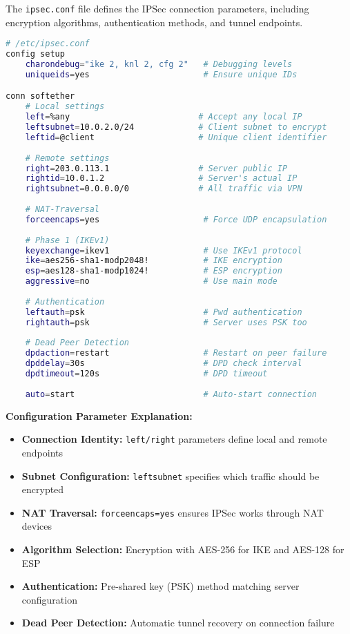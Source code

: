 The \texttt{ipsec.conf} file defines the IPSec connection parameters, including encryption algorithms, authentication methods, and tunnel endpoints.

\begin{lstlisting}[language=bash]
# /etc/ipsec.conf
config setup
    charondebug="ike 2, knl 2, cfg 2"   # Debugging levels
    uniqueids=yes                       # Ensure unique IDs

conn softether
    # Local settings
    left=%any                          # Accept any local IP
    leftsubnet=10.0.2.0/24             # Client subnet to encrypt
    leftid=@client                     # Unique client identifier
    
    # Remote settings  
    right=203.0.113.1                  # Server public IP
    rightid=10.0.1.2                   # Server's actual IP
    rightsubnet=0.0.0.0/0              # All traffic via VPN
    
    # NAT-Traversal
    forceencaps=yes                     # Force UDP encapsulation
    
    # Phase 1 (IKEv1)
    keyexchange=ikev1                   # Use IKEv1 protocol
    ike=aes256-sha1-modp2048!           # IKE encryption
    esp=aes128-sha1-modp1024!           # ESP encryption
    aggressive=no                       # Use main mode
    
    # Authentication
    leftauth=psk                        # Pwd authentication
    rightauth=psk                       # Server uses PSK too
    
    # Dead Peer Detection
    dpdaction=restart                   # Restart on peer failure
    dpddelay=30s                        # DPD check interval
    dpdtimeout=120s                     # DPD timeout
    
    auto=start                          # Auto-start connection
\end{lstlisting}

\textbf{Configuration Parameter Explanation:}

\begin{itemize}
    \item \textbf{Connection Identity:} \texttt{left/right} parameters define local and remote endpoints
    \item \textbf{Subnet Configuration:} \texttt{leftsubnet} specifies which traffic should be encrypted
    \item \textbf{NAT Traversal:} \texttt{forceencaps=yes} ensures IPSec works through NAT devices
    \item \textbf{Algorithm Selection:} Encryption with AES-256 for IKE and AES-128 for ESP
    \item \textbf{Authentication:} Pre-shared key (PSK) method matching server configuration
    \item \textbf{Dead Peer Detection:} Automatic tunnel recovery on connection failure
\end{itemize}

